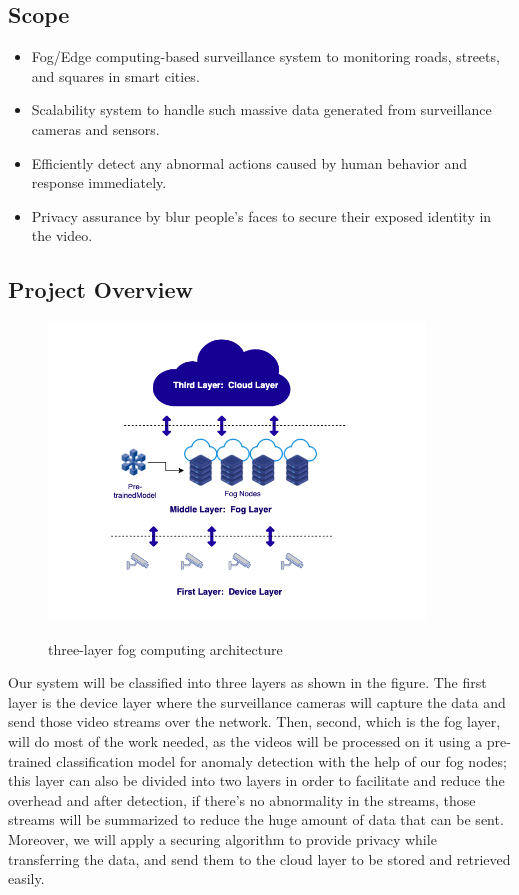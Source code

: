 \documentclass[12pt]{article}
\begin{document}
\subsection{Scope}
\begin{itemize}
\item Fog/Edge computing-based surveillance system to monitoring roads, streets, and squares in smart cities.
\item Scalability system to handle such massive data generated from surveillance cameras and sensors.
\item Efficiently detect any abnormal actions caused by human behavior and response immediately.
\item Privacy assurance by blur people's faces to secure their exposed identity in the video.

\end{itemize}
\newpage
\subsection{Project Overview}
\begin{figure}[!htbp]
  \centering
  \includegraphics[width=10cm]{./1.png}
  \label{layers}
   \caption{three-layer fog computing architecture}
\end{figure}
Our system will be classified into three layers as shown in the figure. The first layer is the device layer where the surveillance cameras will capture the data and send those video streams over the network. Then, second, which is the fog layer, will do most of the work needed, as the videos will be processed on it using a pre-trained classification model for anomaly detection with the help of our fog nodes; this layer can also be divided into two layers in order to facilitate and reduce the overhead and after detection, if there's no abnormality in the streams, those streams will be summarized to reduce the huge amount of data that can be sent. Moreover, we will apply a securing algorithm to provide privacy while transferring the data, and send them to the cloud layer to be stored and retrieved easily.
\end{document}
